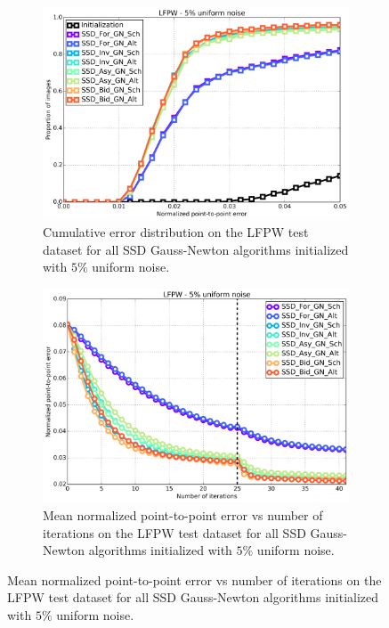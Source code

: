 \begin{figure}[p]
	\centering
	\begin{subfigure}{0.48\textwidth}
	    \includegraphics[width=\textwidth]{experiments/algorithms/ssd_gn/ced_ssd_gn_5.png}
	    \caption{Cumulative error distribution on the LFPW test dataset for all SSD Gauss-Newton algorithms initialized with $5\%$ uniform noise.}
	    \label{fig:ced_ssd_gn_5}
	\end{subfigure}
	\hfill
	\begin{subfigure}{0.48\textwidth}
	    \includegraphics[width=\textwidth]{experiments/algorithms/ssd_gn/mean_error_vs_iters_ssd_gn_5.png}
	    \caption{Mean normalized point-to-point error vs number of iterations on the LFPW test dataset for all SSD Gauss-Newton algorithms initialized with $5\%$ uniform noise.}
	    \label{fig:mean_error_vs_iters_ssd_gn_5}

\end{subfigure}
\end{figure}
